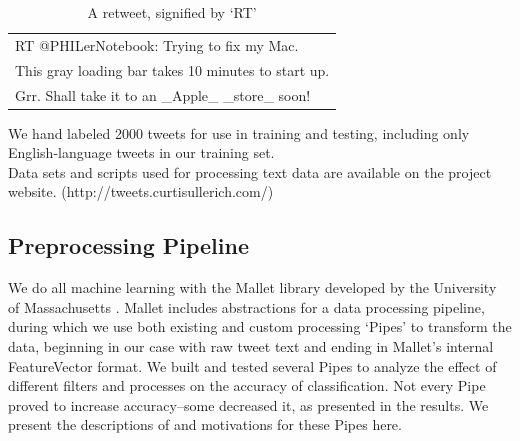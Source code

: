 \documentclass[letterpaper]{article}
\begin{document}
\begin{table}[h]
\centering
\begin{tabular}{|l|}
	\hline
	RT @PHILerNotebook: Trying to fix my Mac. \\ This gray loading bar takes 10 minutes to start up. \\ Grr. Shall take it to an \_Apple\_ \_store\_ soon! \\
	\hline
\end{tabular}
\caption{A retweet, signified by `RT'}
\end{table}

We hand labeled 2000 tweets for use in training and testing, including only English-language tweets in our training set. \\
Data sets and scripts used for processing text data are available on the project website. (http://tweets.curtisullerich.com/)\\

\subsection{Preprocessing Pipeline}

We do all machine learning with the Mallet library developed by the University of Massachusetts \cite{McCallumMALLET}. Mallet includes abstractions for a data processing pipeline, during which we use both existing and custom processing `Pipes' to transform the data, beginning in our case with raw tweet text and ending in Mallet's internal FeatureVector format. We built and tested several Pipes to analyze the effect of different filters and processes on the accuracy of classification. Not every Pipe proved to increase accuracy--some decreased it, as presented in the results. We present the descriptions of and motivations for these Pipes here.
\end{document}
